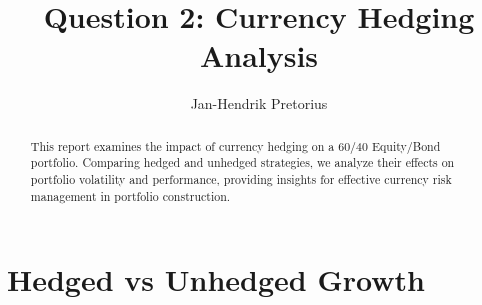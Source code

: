 \documentclass[11pt,preprint, authoryear]{elsarticle}
\numberwithin{equation}{section}
\numberwithin{figure}{section}
\numberwithin{table}{section}
\begin{document}
\begin{frontmatter}  %

\title{Question 2: Currency Hedging Analysis}





\author[Add1]{Jan-Hendrik Pretorius}





\address[Add1]{Stellenbosch University}


\begin{abstract}
\small{
This report examines the impact of currency hedging on a 60/40
Equity/Bond portfolio. Comparing hedged and unhedged strategies, we
analyze their effects on portfolio volatility and performance, providing
insights for effective currency risk management in portfolio
construction.
}
\end{abstract}

\vspace{1cm}





\vspace{0.5cm}

\end{frontmatter}

\setcounter{footnote}{0}



\pagestyle{fancy}
\chead{}
\lfoot{}
\lhead{}
\cfoot{}


\headsep 35pt %




\hypertarget{hedged-vs-unhedged-growth}{%
\section{Hedged vs Unhedged Growth}\label{hedged-vs-unhedged-growth}}
\end{document}
